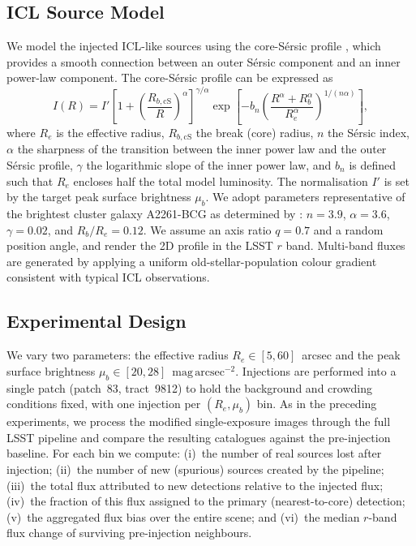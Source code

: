 \documentclass[DM,lsstdraft,authoryear,toc]{lsstdoc}
\begin{document}
\subsection{ICL Source Model}
\label{sec:icl_model}

We model the injected ICL-like sources using the core-S\'{e}rsic profile
\citep{Graham2003}, which provides a smooth connection between an outer
S\'{e}rsic component and an inner power-law component. The core-S\'{e}rsic
profile can be expressed as
\begin{equation}
  I(R) = I' \left[1 + \left(\frac{R_{b,\mathrm{cS}}}{R}\right)^{\!\alpha}\right]^{\!\gamma/\alpha}
         \exp\!\left[-b_n\left(\frac{R^{\alpha} + R_b^{\alpha}}
                                    {R_e^{\alpha}}\right)^{\!1/(n\alpha)}\right],
  \label{eq:core_sersic}
\end{equation}
where $R_e$ is the effective radius, $R_{b,\mathrm{cS}}$ the break
(core) radius, $n$ the S\'{e}rsic index, $\alpha$ the sharpness of the
transition between the inner power law and the outer S\'{e}rsic profile,
$\gamma$ the logarithmic slope of the inner power law, and $b_n$ is
defined such that $R_e$ encloses half the total model luminosity. The
normalisation $I'$ is set by the target peak surface brightness $\mu_b$.
We adopt parameters representative of the brightest cluster galaxy
A2261-BCG as determined by \citet{BonfiniGraham2016}: $n = 3.9$,
$\alpha = 3.6$, $\gamma = 0.02$, and $R_b / R_e = 0.12$. We assume an
axis ratio $q = 0.7$ and a random position angle, and render the 2D
profile in the LSST $r$ band. Multi-band fluxes are generated by
applying a uniform old-stellar-population colour gradient consistent
with typical ICL observations.

\subsection{Experimental Design}
\label{sec:icl_design}

We vary two parameters: the effective radius $R_e \in [5, 60]$~arcsec
and the peak surface brightness $\mu_b \in [20, 28]$~$\mathrm{mag\,arcsec^{-2}}$.
Injections are performed into a single patch (patch~83, tract~9812) to
hold the background and crowding conditions fixed, with one injection per
$(R_e, \mu_b)$ bin. As in the preceding experiments, we process the
modified single-exposure images through the full LSST pipeline and
compare the resulting catalogues against the pre-injection baseline. For
each bin we compute: (i)~the number of real sources lost after
injection; (ii)~the number of new (spurious) sources created by the
pipeline; (iii)~the total flux attributed to new detections relative
to the injected flux; (iv)~the fraction of this flux assigned to the
primary (nearest-to-core) detection; (v)~the aggregated flux bias over
the entire scene; and (vi)~the median $r$-band flux change of surviving
pre-injection neighbours.
\end{document}
